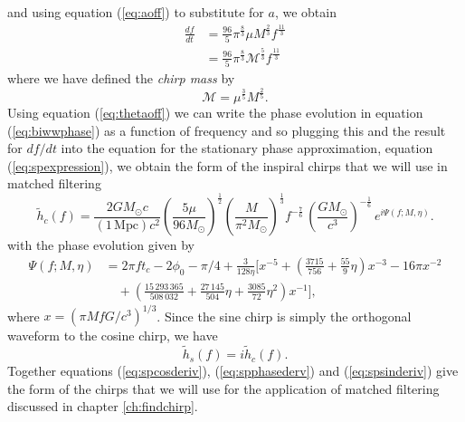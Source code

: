 and using equation (\ref{eq:aoff}) to substitute for $a$, we obtain
\begin{align}
\frac{df}{dt} &= \frac{96}{5} \pi^\frac{8}{3} \mu M^\frac{2}{3} f^\frac{11}{3} \\
&= \frac{96}{5} \pi^\frac{8}{3} \mathcal{M}^\frac{5}{3} f^\frac{11}{3}
\end{align}
where we have defined the \emph{chirp mass} by
\begin{equation}
\mathcal{M} = \mu^\frac{3}{5} M^\frac{2}{5}.
\end{equation}
Using equation (\ref{eq:thetaoff}) we can write the phase evolution in equation
(\ref{eq:biwwphase}) as a function of frequency and so plugging this and the
result for $df/dt$ into the equation for the stationary phase approximation,
equation (\ref{eq:spexpression}), we obtain the form of the inspiral chirps
that we will use in matched filtering
\begin{equation}
\label{eq:spcosderiv}
\tilde{h}_c(f)=\frac{2GM_\odot c}{(1\,\mathrm{Mpc})c^2}
\left(\frac{5\mu}{96M_\odot}\right)^\frac{1}{2}
\left(\frac{M}{\pi^2M_\odot}\right)^\frac{1}{3}
f^{-\frac{7}{6}}\, \left( \frac{GM_\odot}{c^3} \right)^{-\frac{1}{6}}\,
e^{i\Psi(f;M,\eta)}.
\end{equation}
with the phase evolution given by
\begin{equation}
\begin{split}
\Psi(f;M,\eta) &= 2\pi ft_c-2\phi_0-\pi/4+\frac{3}{128\eta}\biggl[x^{-5}+
\left(\frac{3715}{756}+\frac{55}{9}\eta\right)x^{-3}
-16\pi x^{-2} \\
&\quad +\left(\frac{15\,293\,365}{508\,032}+\frac{27\,145}{504}\eta
+\frac{3085}{72}\eta^2\right)x^{-1}\biggr],
\label{eq:spphasederv}
\end{split}
\end{equation}
where $x=(\pi M f G/c^3)^{1/3}$. Since the sine chirp is simply the orthogonal
waveform to the cosine chirp, we have
\begin{equation}
\tilde{h}_s(f)=i\tilde{h}_c(f).
\label{eq:spsinderiv}
\end{equation}
Together equations (\ref{eq:spcosderiv}), (\ref{eq:spphasederv}) and
(\ref{eq:spsinderiv}) give the form of the chirps that we will use for the
application of matched filtering discussed in chapter \ref{ch:findchirp}.

\newpage


